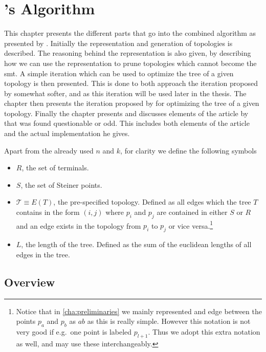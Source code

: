 { \abnormalparskip{0pt}
  \chapter{\citeauthor{smith1992}'s Algorithm}
  \label{cha:algorithm} }


This chapter presents the different parts that go into the combined algorithm as
presented by \textcite{smith1992}. Initially the representation and generation
of topologies is described. The reasoning behind the representation is also
given, by describing how we can use the representation to prune topologies which
cannot become the \acl{smt}. A simple iteration which can be used to optimize
the tree of a given topology is then presented. This is done to both approach
the iteration proposed by \citeauthor{smith1992} somewhat softer, and as this
iteration will be used later in the thesis. The chapter then presents the
iteration proposed by \citeauthor{smith1992} for optimizing the tree of a given
topology. Finally the chapter presents and discusses elements of the article by
\textcite{smith1992} that was found questionable or odd. This includes both
elements of the article and the actual implementation he gives.

Apart from the already used $n$ and $k$, for clarity we define the following symbols
%
\begin{itemize}
\item $R$, the set of terminals.
\item $S$, the set of Steiner points.
\item $\mathcal{T} \equiv E(T)$, the pre-specified topology. Defined as all
  edges which the tree $T$ contains in the form $(i, j)$ where $p_i$ and
  $p_j$ are contained in either $S$ or $R$ and an edge exists in the
  topology from $p_i$ to $p_j$ or vice versa.\footnote{Notice that in
    \cref{cha:preliminaries} we mainly represented and edge between the points
    $p_a$ and $p_b$ as $ab$ as this is really simple. However this notation is not
    very good if e.g.\ one point is labeled $p_{l+1}$. Thus we adopt this extra
    notation as well, and may use these interchangeably.}
\item $L$, the length of the tree. Defined as the sum of the euclidean lengths
  of all edges in the tree.
\end{itemize}

\section{Overview}
\label{sec:overview}

